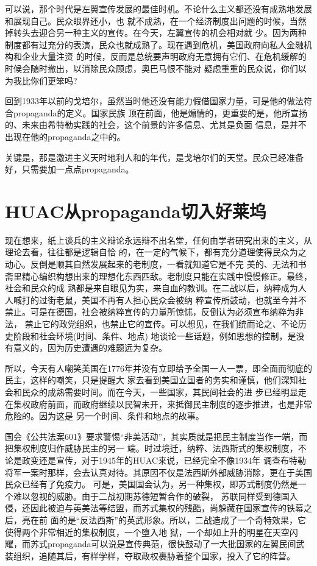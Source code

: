 \documentclass[10pt]{article}
\begin{document}
{可以说，那个时代是左翼宣传发展的最佳时机。不论什么主义都还没有成熟地发展和展现自己。民众眼界还小，也
就不成熟，在一个经济制度出问题的时候，当然掉转头去迎合另一种主义的宣传。在今天，左翼宣传的机会相对就
少。因为两种制度都有过充分的表演，民众也就成熟了。现在遇到危机，美国政府向私人金融机构和企业大量注资
的时候，反而是总统要声明政府无意拥有它们、在危机缓解的时候会随时撤出，以消除民众顾虑，奥巴马恨不能对
疑虑重重的民众说，你们以为我比你们更笨吗?

回到1933年以前的戈培尔，虽然当时他还没有能力假借国家力量，可是他的做法符合propaganda的定义。国家民族
顶在前面，他是煽情的，更重要的是，他所宣扬的、未来由希特勒实践的社会，这个前景的许多信息、尤其是负面
信息，是并不出现在他的propaganda之中的。

关键是，那是激进主义天时地利人和的年代，是戈培尔们的天堂。民众已经准备好，只需要加一点点propaganda。


\pagebreak
\section{HUAC从propaganda切入好莱坞}

现在想来，纸上谈兵的主义辩论永远辩不出名堂，任何由学者研究出来的主义，从理论去看，往往都是逻辑自恰
的，在一定的气候下，都有充分道理使得民众为之动心。反倒是顺其自然发展起来的老制度，一看就知道它是不完
美的、无法和书斋里精心编织构想出来的理想化东西匹敌。老制度只能在实践中慢慢修正。最终，社会和民众的成
熟都是来自眼见为实，来自血的教训。在二战以后，纳粹成为人人喊打的过街老鼠，美国不再有人担心民众会被纳
粹宣传所鼓动，也就至今并不禁止。可是在德国，社会被纳粹宣传的力量所惊怵，反倒认为必须宣布纳粹为非法，
禁止它的政党组织，也禁止它的宣传。可以想见，在我们统而论之、不论历史阶段和社会环境(时间、条件、地点)
地谈论一些话题，例如思想的控制，是没有意义的，因为历史遭遇的难题远为复杂。

所以，今天有人嘲笑美国在1776年并没有立即给予全国一人一票，即全面而彻底的民主，这样的嘲笑，只是提醒大
家去看到美国立国者的务实和谨慎，他们深知社会和民众的成熟需要时间。而在今天，一些国家，其民间社会的进
步已经明显走在集权政府前面，而政府继续以民智未开，来抵御民主制度的逐步推进，也是非常危险的。因为这是
另一个时间、条件和地点的故事。

国会《公共法案601》要求警惕``非美活动''，其实质就是把民主制度当作一端，而把集权制度归作威胁民主的另一
端。时过境迁，纳粹、法西斯式的集权制度，不论是政变还是宣传，对于1945年的HUAC来说，已经完全不像1934年
调查布特勒将军一案时那样，会去认真对待。其原因不仅是法西斯外部威胁消除，更在于美国民众已经有了免疫力。
可是，美国国会认为，另一种集权，即苏式制度仍然是一个难以忽视的威胁。由于二战初期苏德短暂合作的破裂，
苏联同样受到德国入侵，还因此被迫与英美法等结盟，而苏式集权的残酷，尚躲藏在国家宣传的铁幕之后，亮在前
面的是``反法西斯''的英武形象。所以，二战造成了一个奇特效果，它使得两个非常相近的集权制度，一个堕入地
狱，一个却如上升的明星在天空闪耀，而苏式propaganda可以说是宣传典范，很快鼓动了一大批国家的左翼民间武
装组织，追随其后，有样学样，夺取政权裹胁着整个国家，投入了它的阵营。

}
\end{document}
